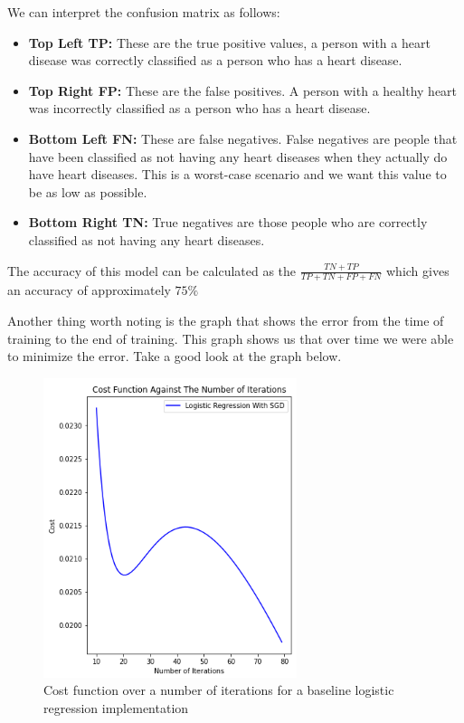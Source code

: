 We can interpret the confusion matrix as follows:
\begin{itemize}
    \item \textbf{Top Left TP: } These are the true positive values, a person with a heart disease was correctly classified as a person who has a heart disease.
    \item \textbf{Top Right FP: } These are the false positives. A person with a healthy heart was incorrectly classified as a person who has a heart disease.
    \item \textbf{Bottom Left FN: } These are false negatives. False negatives are people that have been classified as not having any heart diseases when they actually do have heart diseases. This is a worst-case scenario and we want this value to be as low as possible.
    \item \textbf{Bottom Right TN: } True negatives are those people who are correctly classified as not having any heart diseases.
\end{itemize}

The accuracy of this model can be calculated as the $\frac{TN + TP}{TP + TN + FP + FN}$ which gives an accuracy of approximately $75\%$

Another thing worth noting is the graph that shows the error from the time of training to the end of training. This graph shows us that over time we were able to minimize the error. Take a good look at the graph below.
\begin{figure}[H]
    \begin{center}
        \includegraphics[scale=0.5]{Images/logCOST.png}
    \end{center}
    \caption{Cost function over a number of iterations for a baseline logistic regression implementation}
\end{figure}

